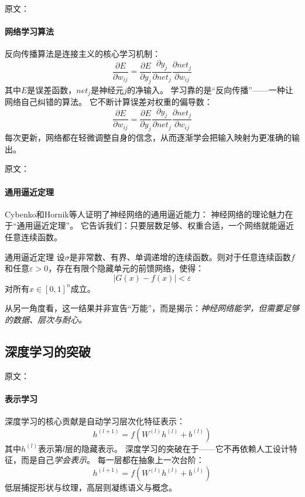 原文：
\paragraph{网络学习算法}
反向传播算法是连接主义的核心学习机制：
$$\frac{\partial E}{\partial w_{ij}} = \frac{\partial E}{\partial y_j} \frac{\partial y_j}{\partial net_j} \frac{\partial net_j}{\partial w_{ij}}$$
其中$E$是误差函数，$net_j$是神经元$j$的净输入。
学习靠的是“反向传播”——一种让网络自己纠错的算法。  
它不断计算误差对权重的偏导数：
$$\frac{\partial E}{\partial w_{ij}} = \frac{\partial E}{\partial y_j} \frac{\partial y_j}{\partial net_j} \frac{\partial net_j}{\partial w_{ij}}$$
每次更新，网络都在轻微调整自身的信念，从而逐渐学会把输入映射为更准确的输出。

原文：
\paragraph{通用逼近定理}
Cybenko和Hornik等人证明了神经网络的通用逼近能力：
神经网络的理论魅力在于“通用逼近定理”。  
它告诉我们：只要层数足够、权重合适，一个网络就能逼近任意连续函数。  
\begin{theorem}[]{通用逼近定理}
设$\sigma$是非常数、有界、单调递增的连续函数。则对于任意连续函数$f$和任意$\varepsilon > 0$，存在有限个隐藏单元的前馈网络，使得：
$$\left|G(x) - f(x)\right| < \varepsilon$$
对所有$x \in [0,1]^n$成立。
\end{theorem}
从另一角度看，这一结果并非宣告“万能”，而是揭示：\emph{神经网络能学，但需要足够的数据、层次与耐心。}

\subsection{深度学习的突破}

原文：
\paragraph{表示学习}
深度学习的核心贡献是自动学习层次化特征表示：
$$h^{(l+1)} = f\left(W^{(l)} h^{(l)} + b^{(l)}\right)$$
其中$h^{(l)}$表示第$l$层的隐藏表示。
深度学习的突破在于——它不再依赖人工设计特征，而是自己\emph{学会表示}。  
每一层都在抽象上一次台阶：
$$h^{(l+1)} = f\left(W^{(l)} h^{(l)} + b^{(l)}\right)$$
低层捕捉形状与纹理，高层则凝练语义与概念。

